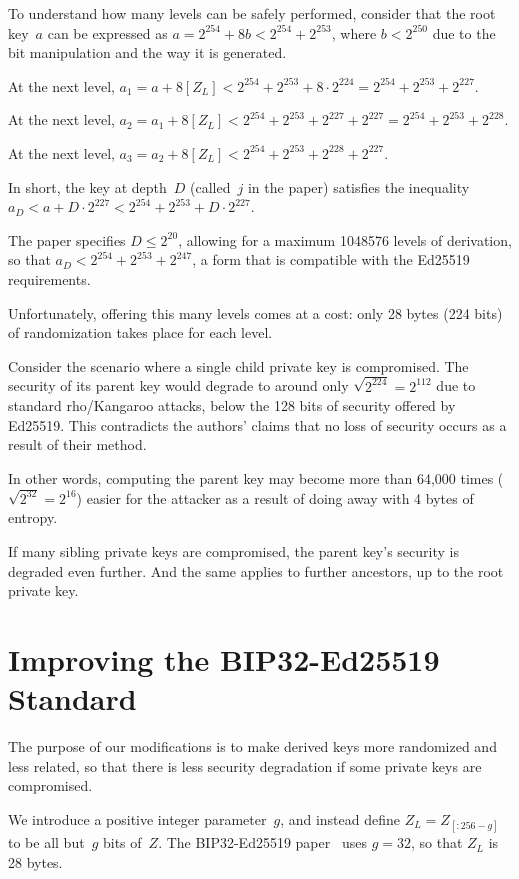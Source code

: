 \documentclass[12pt, a4paper, twocolumn]{article}
\begin{document}
To understand how many levels can be safely performed, consider that the root key~$a$ can be expressed as $a = 2^{254} + 8b < 2^{254} + 2^{253}$, where $b < 2^{250}$ due to the bit manipulation and the way it is generated.

At the next level, $a_{1} = a + 8[Z_L] < 2^{254} + 2^{253} + 8 \cdot 2^{224} = 2^{254} + 2^{253} + 2^{227}$.

At the next level, $a_{2} = a_{1} + 8[Z_L] < 2^{254} + 2^{253} + 2^{227} + 2^{227} = 2^{254} + 2^{253} + 2^{228}$.

At the next level, $a_{3} = a_{2} + 8[Z_L] < 2^{254} + 2^{253} + 2^{228} + 2^{227}$.

In short, the key at depth~$D$ (called~$j$ in the paper) satisfies the inequality $a_D < a + D\cdot2^{227} < 2^{254} + 2^{253} + D\cdot2^{227}$.

The paper specifies $D \leq 2^{20}$, allowing for a maximum 1048576 levels of derivation, so that $a_{D} < 2^{254} + 2^{253} + 2^{247}$, a form that is compatible with the Ed25519 requirements.

Unfortunately, offering this many levels comes at a cost: only 28 bytes (224 bits) of randomization takes place for each level.

Consider the scenario where a single child private key is compromised.
The security of its parent key would degrade to around only $\sqrt{2^{224}}=2^{112}$ due to standard rho/Kangaroo attacks, below the 128 bits of security offered by Ed25519.
This contradicts the authors' claims that no loss of security occurs as a result of their method.

In other words, computing the parent key may become more than 64,000 times ($\sqrt{2^{32}}=2^{16}$) easier for the attacker as a result of doing away with 4 bytes of entropy.

If many sibling private keys are compromised, the parent key's security is degraded even further. And the same applies to further ancestors, up to the root private key.

\section{Improving the BIP32-Ed25519 Standard}

The purpose of our modifications is to make derived keys more randomized and less related, so that there is less security degradation if some private keys are compromised.

We introduce a positive integer parameter~$g$, and instead define $Z_L = Z_{[:256-g]}$ to be all but~$g$ bits of~$Z$.
The BIP32-Ed25519 paper~\cite{BIP32-Ed25519} uses $g=32$, so that $Z_{L}$ is 28 bytes.
\end{document}
